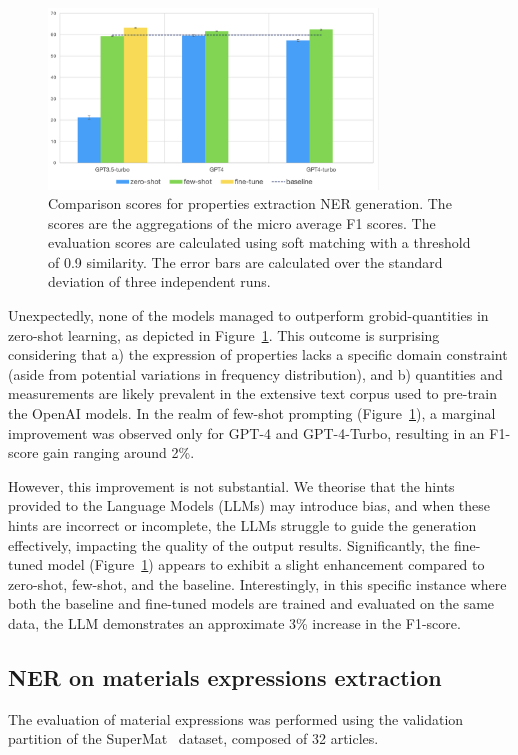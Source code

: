 \documentclass[a4paper]{article}
\begin{document}
\begin{figure}[htbp]
  \centering
  \includegraphics[width=0.78\textwidth]{figures/ner-measeval-all.png} 
  \caption{Comparison scores for properties extraction NER generation. The scores are the aggregations of the micro average F1 scores. The evaluation scores are calculated using soft matching with a threshold of 0.9 similarity. The error bars are calculated over the standard deviation of three independent runs.}
  \label{fig:ner-measeval-all}
\end{figure}

Unexpectedly, none of the models managed to outperform grobid-quantities in zero-shot learning, as depicted in Figure~\ref{fig:ner-measeval-all}. This outcome is surprising considering that a) the expression of properties lacks a specific domain constraint (aside from potential variations in frequency distribution), and b) quantities and measurements are likely prevalent in the extensive text corpus used to pre-train the OpenAI models.
In the realm of few-shot prompting (Figure~\ref{fig:ner-measeval-all}), a marginal improvement was observed only for GPT-4 and GPT-4-Turbo, resulting in an F1-score gain ranging around 2\%. 

However, this improvement is not substantial. 
We theorise that the hints provided to the Language Models (LLMs) may introduce bias, and when these hints are incorrect or incomplete, the LLMs struggle to guide the generation effectively, impacting the quality of the output results.
Significantly, the fine-tuned model (Figure~\ref{fig:ner-measeval-all}) appears to exhibit a slight enhancement compared to zero-shot, few-shot, and the baseline. Interestingly, in this specific instance where both the baseline and fine-tuned models are trained and evaluated on the same data, the LLM demonstrates an approximate 3\% increase in the F1-score.

\subsection{NER on materials expressions extraction}
\label{sec:results-ner-materials}
The evaluation of material expressions was performed using the validation partition of the SuperMat~\cite{lfoppiano2021supermat} dataset, composed of 32 articles.
\end{document}
